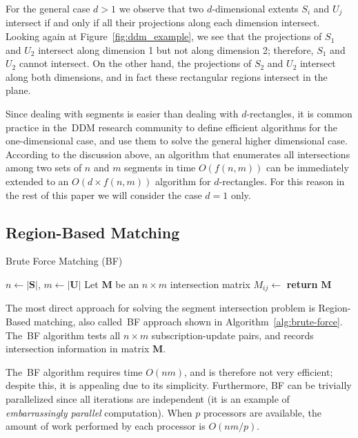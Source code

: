 \documentclass[10pt, conference, compsocconf]{IEEEtran}
\begin{document}
For the general case $d>1$ we observe that two $d$-dimensional extents
$S_i$ and $U_j$ intersect if and only if all their projections along
each dimension intersect. Looking again at
Figure~\ref{fig:ddm_example}, we see that the projections of $S_1$ and
$U_2$ intersect along dimension 1 but not along dimension 2;
therefore, $S_1$ and $U_2$ cannot intersect. On the other hand, the
projections of $S_2$ and $U_2$ intersect along both dimensions, and in
fact these rectangular regions intersect in the plane.

Since dealing with segments is easier than dealing with
$d$-rectangles, it is common practice in the~\ac{DDM} research
community to define efficient algorithms for the one-dimensional case,
and use them to solve the general higher dimensional case. According
to the discussion above, an algorithm that enumerates all
intersections among two sets of $n$ and $m$ segments in time
$O\left(f(n,m)\right)$ can be immediately extended to an $O\left( d
\times f(n,m) \right)$ algorithm for $d$-rectangles.  For this reason
in the rest of this paper we will consider the case $d=1$ only.

\subsection{Region-Based Matching}

\begin{algorithm}[t]
\caption{Brute Force Matching (BF)}\label{alg:brute-force}
\begin{algorithmic}
\State $n \gets |\mathbf{S}|$, $m \gets |\mathbf{U}|$
\State Let $\mathbf{M}$ be an $n \times m$ intersection matrix
\State $M_{ij} \gets$ 
\EndFor
\EndFor
\State \textbf{return} $\mathbf{M}$
\EndFunction
\end{algorithmic}
\end{algorithm}

The most direct approach for solving the segment intersection problem
is Region-Based matching, also called~\acf{BF} approach shown in
Algorithm~\ref{alg:brute-force}. The~\ac{BF} algorithm tests all $n
\times m$ subscription-update pairs, and records intersection
information in matrix $\mathbf{M}$.

The~\ac{BF} algorithm requires time $O(nm)$, and is therefore not very
efficient; despite this, it is appealing due to its
simplicity. Furthermore, \ac{BF} can be trivially parallelized since
all iterations are independent (it is an example of
\emph{embarrassingly parallel} computation). When $p$ processors are
available, the amount of work performed by each processor is
$O\left(nm / p\right)$.
\end{document}
